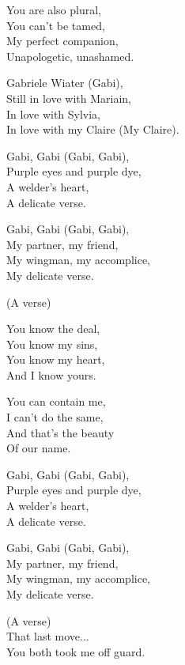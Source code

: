 \begin{lyrics}
You are also plural,\\
You can't be tamed,\\
My perfect companion,\\
Unapologetic, unashamed.

Gabriele Wiater (Gabi),\\
Still in love with Mariain,\\
In love with Sylvia,\\
In love with my Claire
(My Claire).

Gabi, Gabi (Gabi, Gabi),\\
Purple eyes and purple dye,\\
A welder's heart,\\
A delicate verse.

Gabi, Gabi (Gabi, Gabi),\\
My partner, my friend,\\
My wingman, my accomplice,\\
My delicate verse.

(A verse)

You know the deal,\\
You know my sins,\\
You know my heart,\\
And I know yours.

You can contain me,\\
I can't do the same,\\
And that's the beauty\\
Of our name.

Gabi, Gabi (Gabi, Gabi),\\
Purple eyes and purple dye,\\
A welder's heart,\\
A delicate verse.

Gabi, Gabi (Gabi, Gabi),\\
My partner, my friend,\\
My wingman, my accomplice,\\
My delicate verse.

(A verse)
\\
That last move...\\
You both took me off guard.
\end{lyrics}

